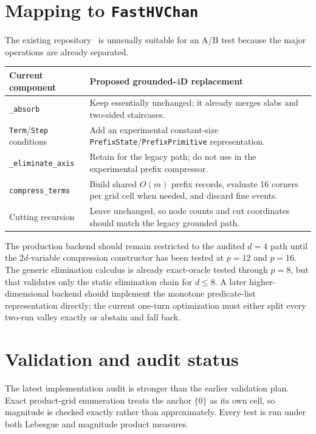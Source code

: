 \documentclass[12pt,a4paper]{article}
\theoremstyle{definition}
\newcommand{\1}{\mathbf 1}
\begin{document}
\section{Mapping to \texttt{FastHVChan}}

The existing repository~\cite{FastHVChan} is unusually suitable for an A/B test because the major operations are already separated.

\begin{center}
\begin{tabular}{>{\raggedright\arraybackslash}p{} >{\raggedright\arraybackslash}p{}}
\toprule
Current component & Proposed grounded-$4$D replacement \\
\midrule
\texttt{\_absorb} & Keep essentially unchanged; it already merges slabs and two-sided staircases. \\
\texttt{Term}/\texttt{Step} conditions & Add an experimental constant-size \texttt{PrefixState}/\texttt{PrefixPrimitive} representation. \\
\texttt{\_eliminate\_axis} & Retain for the legacy path; do not use in the experimental prefix compressor. \\
\texttt{compress\_terms} & Build shared $O(m)$ prefix records, evaluate 16 corners per grid cell when needed, and discard fine events. \\
Cutting recursion & Leave unchanged, so node counts and cut coordinates should match the legacy grounded path. \\
\bottomrule
\end{tabular}
\end{center}

The production backend should remain restricted to the audited $d=4$ path until the $2d$-variable compression constructor has been tested at $p=12$ and $p=16$.  The generic elimination calculus is already exact-oracle tested through $p=8$, but that validates only the static elimination chain for $d\le8$.  A later higher-dimensional backend should implement the monotone predicate-list representation directly; the current one-turn optimization must either split every two-run valley exactly or abstain and fall back.

\section{Validation and audit status}

The latest implementation audit is stronger than the earlier validation plan. Exact product-grid enumeration treats the anchor $\{0\}$ as its own cell, so magnitude is checked exactly rather than approximately. Every test is run under both Lebesgue and magnitude product measures.
\end{document}
